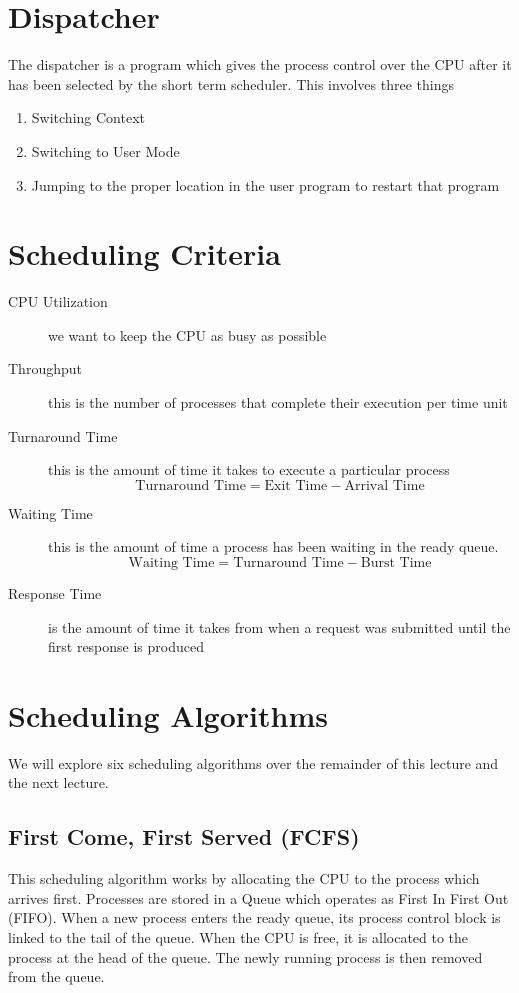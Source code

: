 \section*{Dispatcher}
The dispatcher is a program which gives the process control over the CPU after it has been selected by the short term scheduler. This involves three things

\begin{enumerate}
    \item Switching Context
    \item Switching to User Mode
    \item Jumping to the proper location in the user program to restart that program
\end{enumerate}

\section*{Scheduling Criteria}
\begin{description}
    \item[CPU Utilization] we want to keep the CPU as busy as possible
    \item[Throughput] this is the number of processes that complete their execution per time unit
    \item[Turnaround Time] this is the amount of time it takes to execute a particular process
    \[\text{Turnaround Time} = \text{Exit Time} - \text{Arrival Time}\]
    \item[Waiting Time] this is the amount of time a process has been waiting in the ready queue. 
    \[\text{Waiting Time} = \text{Turnaround Time} - \text{Burst Time}\]
    \item[Response Time] is the amount of time it takes from when a request was submitted until the first response is produced
\end{description}

\section*{Scheduling Algorithms}
We will explore six scheduling algorithms over the remainder of this lecture and the next lecture.
\subsection*{First Come, First Served (FCFS)}
This scheduling algorithm works by allocating the CPU to the process which arrives first. Processes are stored in a Queue which operates as First In First Out (FIFO). When a new process enters the ready queue, its process control block is linked to the tail of the queue. When the CPU is free, it is allocated to the process at the head of the queue. The newly running process is then removed from the queue.

